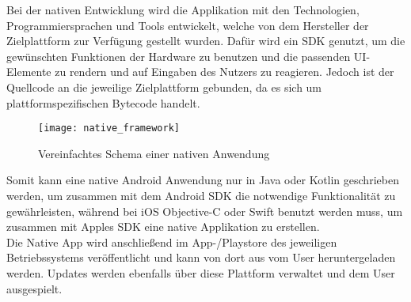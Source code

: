 Bei der nativen Entwicklung wird die Applikation mit den Technologien, Programmiersprachen und Tools entwickelt, welche von dem Hersteller der Zielplattform zur Verfügung gestellt wurden. Dafür wird ein \ac{SDK} genutzt, um die gewünschten Funktionen der Hardware zu benutzen und die passenden \ac{UI}-Elemente zu rendern und auf Eingaben des Nutzers zu reagieren. Jedoch ist der Quellcode an die jeweilige Zielplattform gebunden, da es sich um plattformspezifischen Bytecode handelt.
\begin{figure}[h]
	\texttt{[image: native\_framework]}
	\centering
	\caption{Vereinfachtes Schema einer nativen Anwendung}
\end{figure}

Somit kann eine native Android Anwendung nur in Java oder Kotlin geschrieben werden, um zusammen mit dem Android \ac{SDK} die notwendige Funktionalität zu gewährleisten, während bei iOS Objective-C oder Swift benutzt werden muss, um zusammen mit Apples \ac{SDK} eine native Applikation zu erstellen\cite{rieger_evaluation}.\\

Die Native App wird anschließend im App-/Playstore des jeweiligen Betriebssystems veröffentlicht und kann von dort aus vom User heruntergeladen werden. Updates werden ebenfalls über diese Plattform verwaltet und dem User ausgespielt.

